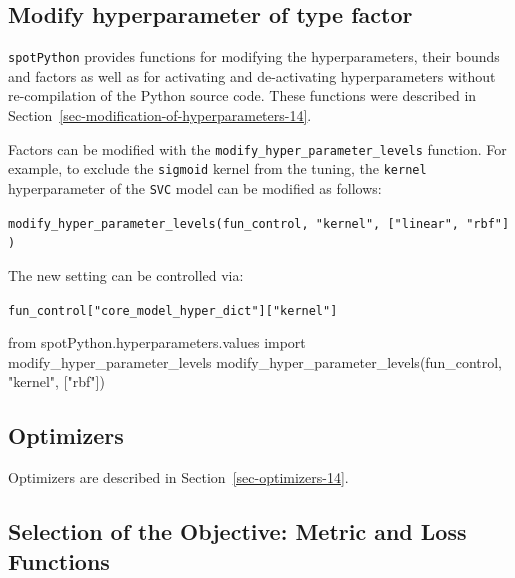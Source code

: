\documentclass[
  letterpaper,
  DIV=11,
  numbers=noendperiod]{scrreprt}
\newenvironment{Shaded}{\begin{snugshade}}{\end{snugshade}}
\newcommand{\ImportTok}[1]{\textcolor[rgb]{0.00,0.46,0.62}{#1}}
\newcommand{\NormalTok}[1]{\textcolor[rgb]{0.00,0.23,0.31}{#1}}
\newcommand{\StringTok}[1]{\textcolor[rgb]{0.13,0.47,0.30}{#1}}
\begin{document}
\hypertarget{modify-hyperparameter-of-type-factor-4}{%
\subsection{Modify hyperparameter of type
factor}\label{modify-hyperparameter-of-type-factor-4}}

\texttt{spotPython} provides functions for modifying the
hyperparameters, their bounds and factors as well as for activating and
de-activating hyperparameters without re-compilation of the Python
source code. These functions were described in
Section~\ref{sec-modification-of-hyperparameters-14}.

Factors can be modified with the
\texttt{modify\_hyper\_parameter\_levels} function. For example, to
exclude the \texttt{sigmoid} kernel from the tuning, the \texttt{kernel}
hyperparameter of the \texttt{SVC} model can be modified as follows:

\texttt{modify\_hyper\_parameter\_levels(fun\_control,\ "kernel",\ {[}"linear",\ "rbf"{]})}

The new setting can be controlled via:

\texttt{fun\_control{[}"core\_model\_hyper\_dict"{]}{[}"kernel"{]}}

\begin{Shaded}
\begin{Highlighting}[]
\ImportTok{from}\NormalTok{ spotPython.hyperparameters.values }\ImportTok{import}\NormalTok{ modify\_hyper\_parameter\_levels}
\NormalTok{modify\_hyper\_parameter\_levels(fun\_control, }\StringTok{"kernel"}\NormalTok{, [}\StringTok{"rbf"}\NormalTok{])}
\end{Highlighting}
\end{Shaded}

\hypertarget{sec-optimizers-18}{%
\subsection{Optimizers}\label{sec-optimizers-18}}

Optimizers are described in Section~\ref{sec-optimizers-14}.

\hypertarget{selection-of-the-objective-metric-and-loss-functions-2}{%
\subsection{Selection of the Objective: Metric and Loss
Functions}\label{selection-of-the-objective-metric-and-loss-functions-2}}
\end{document}
